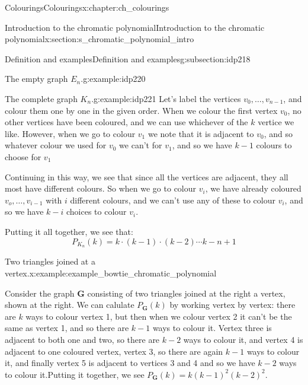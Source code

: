 \documentclass[oneside,10pt,]{book}
\numberwithin{equation}{section}
\newcommand{\bfG}{\mathbf{G}}
\begin{document}
\begin{chapterptx}{Colourings}{}{Colourings}{}{}{x:chapter:ch_colourings}
\begin{sectionptx}{Introduction to the chromatic polynomial}{}{Introduction to the chromatic polynomial}{}{}{x:section:s_chromatic_polynomial_intro}
\begin{subsectionptx}{Definition and examples}{}{Definition and examples}{}{}{g:subsection:idp218}
\begin{example}{The empty graph \(E_n\).}{g:example:idp220}
\end{example}
\begin{example}{The complete graph \(K_n\).}{g:example:idp221}%
Let's label the vertices \(v_0,\dots, v_{n-1}\), and colour them one by one in the given order.  When we colour the first vertex \(v_0\), no other vertices have been coloured, and we can use whichever of the \(k\) vertice we like.  However, when we go to colour \(v_1\) we note that it is adjacent to \(v_0\), and so whatever colour we used for \(v_0\) we can't for \(v_1\), and so we have \(k-1\) colours to choose for \(v_1\)%
\par
Continuing in this way, we see that since all the vertices are adjacent, they all most have different colours.  So when we go to colour \(v_i\), we have already coloured \(v_o,\dots, v_{i-1}\) with \(i\) different colours, and we can't use any of these to colour \(v_i\), and so we have \(k-i\) choices to colour \(v_i\).%
\par
Putting it all together, we see that:%
\begin{equation*}
P_{K_n}(k)=k\cdot (k-1)\cdot (k-2)\cdots k-n+1
\end{equation*}
%
\end{example}
\begin{example}{Two triangles joined at a vertex.}{x:example:example_bowtie_chromatic_polynomial}%
\begin{sidebyside}{2}{0.025}{0.025}{0.05}%
\begin{sbspanel}{0.6}%
Consider the graph \(\bfG\) consisting of two triangles joined at the right a vertex, shown at the right.  We can calulate \(P_\bfG(k)\) by working vertex by vertex: there are \(k\) ways to colour vertex 1, but then when we colour vertex 2 it can't be the same as vertex 1, and so there are \(k-1\) ways to colour it.  Vertex three is adjacent to both one and two, so there are \(k-2\) ways to colour it, and vertex 4 is adjacent to one coloured vertex, vertex 3, so there are again \(k-1\) ways to colour it, and finally vertex 5 is adjacent to vertices 3 and 4 and so we have \(k-2\) ways to colour it.Putting it together, we see \(P_\bfG(k)=k(k-1)^2(k-2)^2\).%
\end{sbspanel}%
\begin{sbspanel}{0.3}%
\end{sbspanel}
\end{sidebyside}
\end{example}
\end{subsectionptx}
\end{sectionptx}
\end{chapterptx}
\end{document}
